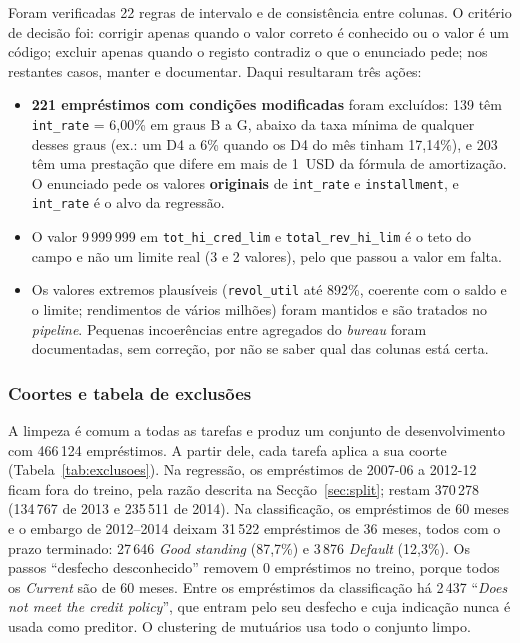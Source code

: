 Foram verificadas 22 regras de intervalo e de consistência entre colunas. O critério de
decisão foi: corrigir apenas quando o valor correto é conhecido ou o valor é um código;
excluir apenas quando o registo contradiz o que o enunciado pede; nos restantes casos,
manter e documentar. Daqui resultaram três ações:
\begin{itemize}
  \item \textbf{221 empréstimos com condições modificadas} foram excluídos: 139 têm
  \texttt{int\_rate} = 6,00\% em graus B a G, abaixo da taxa mínima de qualquer desses
  graus (ex.: um D4 a 6\% quando os D4 do mês tinham 17,14\%), e 203 têm uma prestação que
  difere em mais de 1~USD da fórmula de amortização. O enunciado pede os valores
  \textbf{originais} de \texttt{int\_rate} e \texttt{installment}, e \texttt{int\_rate} é o
  alvo da regressão.
  \item O valor 9\,999\,999 em \texttt{tot\_hi\_cred\_lim} e \texttt{total\_rev\_hi\_lim} é
  o teto do campo e não um limite real (3 e 2 valores), pelo que passou a valor em falta.
  \item Os valores extremos plausíveis (\texttt{revol\_util} até 892\%, coerente com o saldo
  e o limite; rendimentos de vários milhões) foram mantidos e são tratados no
  \textit{pipeline}. Pequenas incoerências entre agregados do \textit{bureau} foram
  documentadas, sem correção, por não se saber qual das colunas está certa.
\end{itemize}

\subsubsection{Coortes e tabela de exclusões}

A limpeza é comum a todas as tarefas e produz um conjunto de desenvolvimento com
466\,124 empréstimos. A partir dele, cada tarefa aplica a sua coorte
(Tabela~\ref{tab:exclusoes}). Na regressão, os empréstimos de 2007-06 a 2012-12 ficam fora
do treino, pela razão descrita na Secção~\ref{sec:split}; restam 370\,278 (134\,767 de 2013
e 235\,511 de 2014). Na classificação, os empréstimos de 60 meses e o embargo de 2012--2014
deixam 31\,522 empréstimos de 36 meses, todos com o prazo terminado: 27\,646
\textit{Good standing} (87,7\%) e 3\,876 \textit{Default} (12,3\%). Os passos ``desfecho
desconhecido'' removem 0 empréstimos no treino, porque todos os \textit{Current} são de 60
meses. Entre os empréstimos da classificação há 2\,437 ``\textit{Does not meet the credit
policy}'', que entram pelo seu desfecho e cuja indicação nunca é usada como preditor. O
clustering de mutuários usa todo o conjunto limpo.

